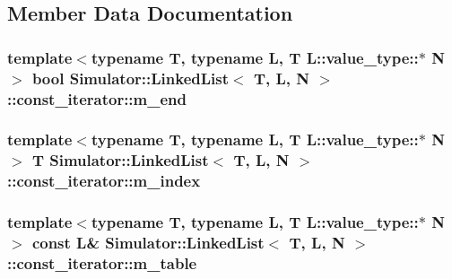 \subsection{Member Data Documentation}
\hypertarget{struct_simulator_1_1_linked_list_1_1const__iterator_af3f7d3d1a4da25721f378c996b9228e4}{
\subsubsection[{m\+\_\+end}]{\setlength{\rightskip}{0pt plus 5cm}template$<$typename T, typename L, T L\+::value\+\_\+type\+::$\ast$ N$>$ bool {\bf Simulator\+::\+Linked\+List}$<$ T, L, N $>$\+::const\+\_\+iterator\+::m\+\_\+end}}\label{struct_simulator_1_1_linked_list_1_1const__iterator_af3f7d3d1a4da25721f378c996b9228e4}
\hypertarget{struct_simulator_1_1_linked_list_1_1const__iterator_a0a9191de644882cfeaaf56e27c23dea0}{
\subsubsection[{m\+\_\+index}]{\setlength{\rightskip}{0pt plus 5cm}template$<$typename T, typename L, T L\+::value\+\_\+type\+::$\ast$ N$>$ T {\bf Simulator\+::\+Linked\+List}$<$ T, L, N $>$\+::const\+\_\+iterator\+::m\+\_\+index}}\label{struct_simulator_1_1_linked_list_1_1const__iterator_a0a9191de644882cfeaaf56e27c23dea0}
\hypertarget{struct_simulator_1_1_linked_list_1_1const__iterator_a441ccfd84d590d0db01255a9e93b2e75}{
\subsubsection[{m\+\_\+table}]{\setlength{\rightskip}{0pt plus 5cm}template$<$typename T, typename L, T L\+::value\+\_\+type\+::$\ast$ N$>$ const L\& {\bf Simulator\+::\+Linked\+List}$<$ T, L, N $>$\+::const\+\_\+iterator\+::m\+\_\+table}}\label{struct_simulator_1_1_linked_list_1_1const__iterator_a441ccfd84d590d0db01255a9e93b2e75}
